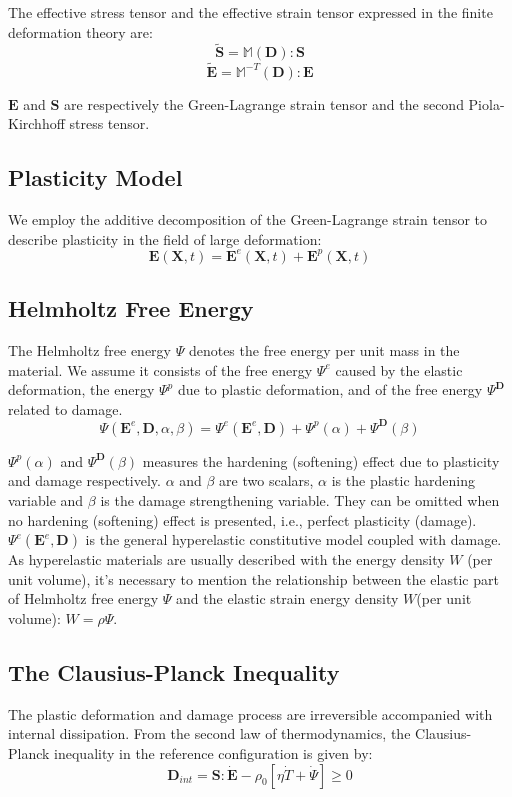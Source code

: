 \documentclass[11pt,fullpage]{article}
\begin{document}
The effective stress tensor and the effective strain tensor expressed
in the finite deformation theory are:
$$
\tilde{\bm{S}} = \mathbb{M}(\bm{D}):\bm{S}
$$
$$
\tilde{\bm{E}} = \mathbb{M}^{-T}(\bm{D}):\bm{E}
$$

$\bm{E}$ and $\bm{S}$ are respectively the Green-Lagrange strain
tensor and the second Piola-Kirchhoff stress tensor.

\subsection{Plasticity Model}

We employ the additive decomposition of the Green-Lagrange strain tensor
to describe plasticity in the field of large deformation:
$$
\bm{E}(\bm{X},t) = \bm{E}^e(\bm{X},t)+\bm{E}^p(\bm{X},t)
$$

\subsection{Helmholtz Free Energy}

The Helmholtz free energy $\Psi$ denotes the free energy per unit mass
in the material. We assume it consists of the free energy
$\Psi^{e}$ caused by the elastic deformation, the energy
$\Psi^{p}$ due to plastic deformation, and of the free energy
$\Psi^{\bm{D}}$ related to damage.
$$
\Psi(\bm{E}^e,\bm{D},\alpha,\beta) = \Psi^{e}(\bm{E}^e,\bm{D}) + \Psi^{p}(\alpha) + \Psi^{\bm{D}}(\beta)
$$

$\Psi^{p}(\alpha)$ and $ \Psi^{\bm{D}}(\beta)$ measures the
hardening (softening) effect due to plasticity and damage
respectively. $\alpha$ and $\beta$ are two scalars, $\alpha$ is the plastic hardening variable and $\beta$
is the damage strengthening variable. They can be omitted when no hardening
(softening) effect is presented, i.e., perfect plasticity
(damage). $\Psi^{e}(\bm{E}^e,\bm{D})$ is the general hyperelastic
constitutive model coupled with damage. As hyperelastic materials are
usually described with the energy density $W$ (per unit volume), it's
necessary to mention the relationship between the elastic part of
Helmholtz free energy $\Psi$ and the elastic strain
energy density $W$(per unit volume): $W = \rho\Psi$.

\subsection{The Clausius-Planck Inequality}

The plastic deformation and damage process are irreversible accompanied
with internal dissipation. From the second law of thermodynamics, the Clausius-Planck inequality in the reference configuration is given by:
$$
\bm{D}_{int} = \bm{S}:\dot{\bm{E}} - \rho_0[\eta\dot{T}+\dot{\Psi}] \geq 0
$$
\end{document}
